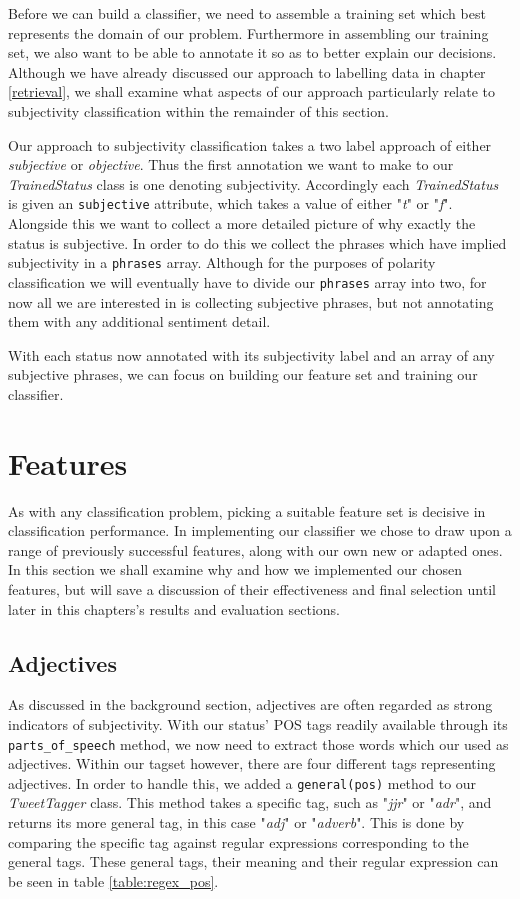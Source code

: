 Before we can build a classifier, we need to assemble a training set which best represents the domain of our problem. Furthermore in assembling our training set, we also want to be able to annotate it so as to better explain our decisions. Although we have already discussed our approach to labelling data in chapter \ref{retrieval}, we shall examine what aspects of our approach particularly relate to subjectivity classification within the remainder of this section.

Our approach to subjectivity classification takes a two label approach of either \emph{subjective} or \emph{objective}. Thus the first annotation we want to make to our \emph{TrainedStatus} class is one denoting subjectivity. Accordingly each \emph{TrainedStatus} is given an \texttt{subjective} attribute, which takes a value of either "\emph{t}" or "\emph{f}". Alongside this we want to collect a more detailed picture of why exactly the status is subjective. In order to do this we collect the phrases which have implied subjectivity in a \texttt{phrases} array. Although for the purposes of polarity classification we will eventually have to divide our \texttt{phrases} array into two, for now all we are interested in is collecting subjective phrases, but not annotating them with any additional sentiment detail.

With each status now annotated with its subjectivity label and an array of any subjective phrases, we can focus on building our feature set and training our classifier.

\section{Features}

As with any classification problem, picking a suitable feature set is decisive in classification performance. In implementing our classifier we chose to draw upon a range of previously successful features, along with our own new or adapted ones. In this section we shall examine why and how we implemented our chosen features, but will save a discussion of their effectiveness and final selection until later in this chapters's results and evaluation sections.

\subsection{Adjectives}

As discussed in the background section, adjectives are often regarded as strong indicators of subjectivity. With our status' POS tags readily available through its \texttt{parts\_of\_speech} method, we now need to extract those words which our used as adjectives. Within our tagset however, there are four different tags representing adjectives. In order to handle this, we added a \texttt{general(pos)} method to our \emph{TweetTagger} class. This method takes a specific tag, such as "\emph{jjr}" or "\emph{adr}", and returns its more general tag, in this case "\emph{adj}" or "\emph{adverb}". This is done by comparing the specific tag against regular expressions corresponding to the general tags. These general tags, their meaning and their regular expression can be seen in table \ref{table:regex_pos}.

